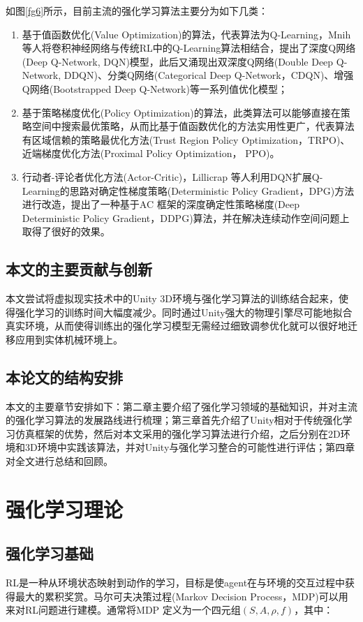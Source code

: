 \documentclass[bachelor]{thesis-uestc}
\begin{document}
	如图\ref{fg6}所示，目前主流的强化学习算法主要分为如下几类：
	\begin{enumerate}
		\item 基于值函数优化(Value Optimization)的算法，代表算法为Q-Learning，Mnih 等人将卷积神经网络与传统RL中的Q-Learning算法相结合，提出了深度Q网络(Deep Q-Network, DQN)模型，此后又涌现出双深度Q网络(Double Deep Q-Network, DDQN)、分类Q网络(Categorical Deep Q-Network，CDQN)、增强Q网络(Bootstrapped Deep Q-Network)等一系列值优化模型；
		
		\item 基于策略梯度优化(Policy Optimization)的算法，此类算法可以能够直接在策略空间中搜索最优策略，从而比基于值函数优化的方法实用性更广，代表算法有区域信赖的策略最优化方法(Trust Region Policy Optimization，TRPO)、近端梯度优化方法(Proximal Policy Optimization， PPO)。
		
		\item 行动者-评论者优化方法(Actor-Critic)，Lillicrap 等人利用DQN扩展Q-Learning的思路对确定性梯度策略(Deterministic Policy Gradient，DPG)方法进行改造，提出了一种基于AC 框架的深度确定性策略梯度(Deep Deterministic Policy Gradient，DDPG)算法，并在解决连续动作空间问题上取得了很好的效果。
	\end{enumerate}
	
	\section{本文的主要贡献与创新}
	本文尝试将虚拟现实技术中的Unity 3D环境与强化学习算法的训练结合起来，使得强化学习的训练时间大幅度减少。同时通过Unity强大的物理引擎尽可能地拟合真实环境，从而使得训练出的强化学习模型无需经过细致调参优化就可以很好地迁移应用到实体机械环境上。
	
	\section{本论文的结构安排}
	本文的主要章节安排如下：第二章主要介绍了强化学习领域的基础知识，并对主流的强化学习算法的发展路线进行梳理；第三章首先介绍了Unity相对于传统强化学习仿真框架的优势，然后对本文采用的强化学习算法进行介绍，之后分别在2D环境和3D环境中实践该算法，并对Unity与强化学习整合的可能性进行评估；第四章对全文进行总结和回顾。
	
	\chapter{强化学习理论}
	\section{强化学习基础}
	RL是一种从环境状态映射到动作的学习，目标是使agent在与环境的交互过程中获得最大的累积奖赏。马尔可夫决策过程(Markov Decision Process，MDP)可以用来对RL问题进行建模。通常将MDP 定义为一个四元组$(S,A,\rho,f)$，其中：
	
\end{document}
